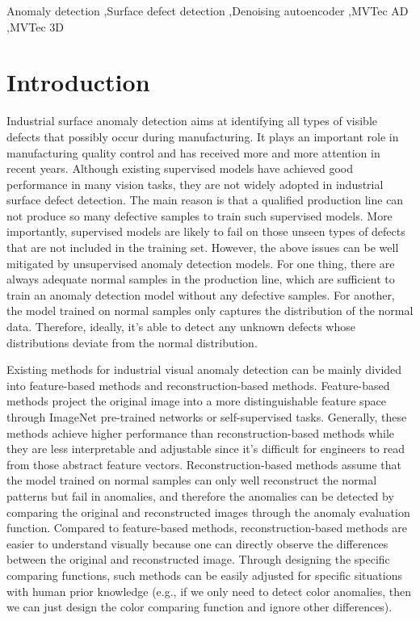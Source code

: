 \documentclass[5p, twocolumn]{elsarticle}[draft]
\begin{document}
\begin{frontmatter}
\begin{keyword}
Anomaly detection \sep Surface defect detection \sep Denoising autoencoder \sep MVTec AD \sep MVTec 3D 




\end{keyword}

\end{frontmatter}



\section{Introduction}
\label{}
Industrial surface anomaly detection aims at identifying all types of visible defects that possibly occur during manufacturing. It plays an important role in manufacturing quality control and has received more and more attention in recent years. Although existing supervised models have achieved good performance in many vision tasks, they are not widely adopted in industrial surface defect detection. The main reason is that a qualified production line can not produce so many defective samples to train such supervised models. More importantly, supervised models are likely to fail on those unseen types of defects that are not included in the training set. However, the above issues can be well mitigated by unsupervised anomaly detection models. For one thing, there are always adequate normal samples in the production line, which are sufficient to train an anomaly detection model without any defective samples. For another, the model trained on normal samples only captures the distribution of the normal data. Therefore, ideally, it's able to detect any unknown defects whose distributions deviate from the normal distribution.

Existing methods for industrial visual anomaly detection can be mainly divided into feature-based methods and reconstruction-based methods. Feature-based methods project the original image into a more distinguishable feature space through ImageNet pre-trained networks or self-supervised tasks. Generally, these methods achieve higher performance than reconstruction-based methods while they are less interpretable and adjustable since it's difficult for engineers to read from those abstract feature vectors. Reconstruction-based methods assume that the model trained on normal samples can only well reconstruct the normal patterns but fail in anomalies, and therefore the anomalies can be detected by comparing the original and reconstructed images through the anomaly evaluation function. Compared to feature-based methods, reconstruction-based methods are easier to understand visually because one can directly observe the differences between the original and reconstructed image. Through designing the specific comparing functions, such methods can be easily adjusted for specific situations with human prior knowledge (e.g., if we only need to detect color anomalies, then we can just design the color comparing function and ignore other differences).
\end{document}
